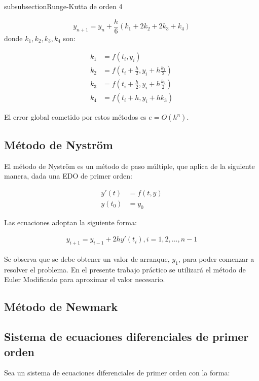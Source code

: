 \documentclass[titlepage,a4paper]{article}
\begin{document}
	subsubsection{Runge-Kutta de orden 4}

	\begin{equation}
		y_{n+1} = y_n + \frac{h}{6} (k_1 + 2k_2 + 2k_3 + k_4)
	\end{equation}
	donde $ k_1, k_2, k_3, k_4 $ son:

	\begin{align*}
		k_1 &= f(t_i, y_i) \\
		k_2 &= f(t_i + \frac{h}{2}, y_i + h \frac{k_1}{2})\\
		k_3 &= f(t_i + \frac{h}{2}, y_i + h \frac{k_2}{2})\\
		k_4 &= f(t_i + h, y_i + h k_3)
	\end{align*}

	El error global cometido por estos métodos es $ e = O(h^n) $.
 
	\subsection{Método de Nystr\"om}

	El método de Nystr\"om es un método de paso múltiple, que aplica de la siguiente manera, dada una EDO de primer orden:

	\begin{align*}
		y'(t) &= f(t, y)\\
		y(t_{0}) &= y_{0}
	\end{align*}

	Las ecuaciones adoptan la siguiente forma: 

	\begin{align*}
		y_{i+1} = y_{i-1} + 2h y'(t_i), i = 1, 2,..., n - 1
	\end{align*}

	Se observa que se debe obtener un valor de arranque, $ y_1 $, para poder comenzar a resolver el problema. En el presente trabajo práctico se utilizará el método de Euler Modificado para aproximar el valor necesario. 

	\subsection{Método de Newmark}

	\subsection{Sistema de ecuaciones diferenciales de primer orden}\cite{burden_system_diff_eq}
		Sea un sistema de ecuaciones diferenciales de primer orden con la forma:
\end{document}
